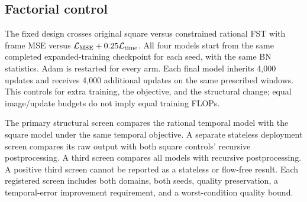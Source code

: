 \subsection{Factorial control}
The fixed design crosses original square versus constrained rational FST
with frame MSE versus $\mathcal L_{\rm MSE}+0.25\mathcal L_{\rm time}$.
All four models start from the same completed expanded-training checkpoint
for each seed, with the same BN statistics. Adam is restarted for every
arm. Each final model inherits 4,000 updates and receives 4,000 additional
updates on the same prescribed windows. This controls for extra training,
the objective, and the structural change; equal image/update budgets do
not imply equal training FLOPs.

The primary structural screen compares the rational temporal model with
the square model under the same temporal objective. A separate stateless
deployment screen compares its raw output with both square controls'
recursive postprocessing. A third screen compares all models with
recursive postprocessing. A positive third screen cannot be reported as a
stateless or flow-free result. Each registered screen includes both domains,
both seeds, quality preservation, a temporal-error improvement requirement,
and a worst-condition quality bound.
